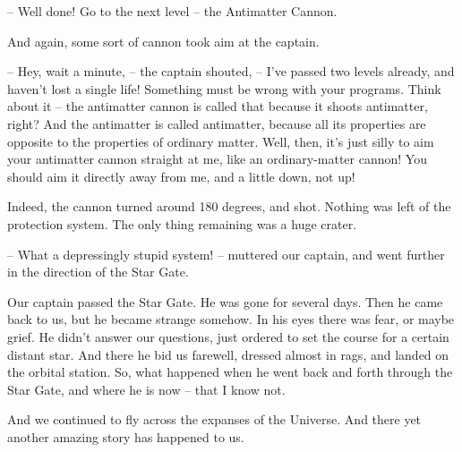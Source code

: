 \documentclass[ebook,twoside,final,openright]{memoir}
\begin{document}
– Well done! Go to the next level – the Antimatter Cannon.\par
And again, some sort of cannon took aim at the captain.\par
– Hey, wait a minute, – the captain shouted, – I’ve passed two levels already, and haven’t lost a single life! Something must be wrong with your programs. Think about it – the antimatter cannon is called that because it shoots antimatter, right? And the antimatter is called antimatter, because all its properties are opposite to the properties of ordinary matter. Well, then, it’s just silly to aim your antimatter cannon straight at me, like an ordinary-matter cannon! You should aim it directly away from me, and a little down, not up!\par
\par
Indeed, the cannon turned around 180 degrees, and shot. Nothing was left of the protection system. The only thing remaining was a huge crater.\par
– What a depressingly stupid system! – muttered our captain, and went further in the direction of the Star Gate.\par
\par
Our captain passed the Star Gate. He was gone for several days. Then he came back to us, but he became strange somehow. In his eyes there was fear, or maybe grief. He didn’t answer our questions, just ordered to set the course for a certain distant star. And there he bid us farewell, dressed almost in rags, and landed on the orbital station. So, what happened when he went back and forth through the Star Gate, and where he is now – that I know not. \par
\par
 And we continued to fly across the expanses of the Universe. And there yet another amazing story has happened to us.
\end{document}
